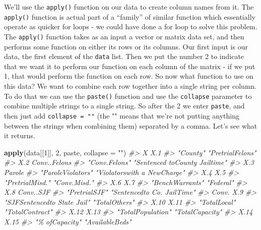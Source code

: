 \documentclass[
  12pt,
]{book}
\newenvironment{Shaded}{\begin{snugshade}}{\end{snugshade}}
\newcommand{\CommentTok}[1]{\textcolor[rgb]{0.37,0.37,0.37}{\textit{#1}}}
\newcommand{\DataTypeTok}[1]{\textcolor[rgb]{0.27,0.27,0.27}{#1}}
\newcommand{\DecValTok}[1]{\textcolor[rgb]{0.06,0.06,0.06}{#1}}
\newcommand{\KeywordTok}[1]{\textcolor[rgb]{0.27,0.27,0.27}{\textbf{#1}}}
\newcommand{\NormalTok}[1]{#1}
\newcommand{\StringTok}[1]{\textcolor[rgb]{0.5,0.5,0.5}{#1}}
\begin{document}
We'll use the \texttt{apply()} function on our data to create column names from it. The \texttt{apply()} function is actual part of a ``family'' of similar function which essentially operate as quicker for loops - we could have done a for loop to solve this problem. The \texttt{apply()} function takes as an input a vector or matrix data set, and then performs some function on either its rows or its columns. Our first input is our data, the first element of the \texttt{data} list. Then we put the number 2 to indicate that we want it to perform our function on each column of the matrix - if we put 1, that would perform the function on each row. So now what function to use on this data? We want to combine each row together into a single string per column. To do that we can use the \texttt{paste()} function and use the \texttt{collapse} parameter to combine multiple strings to a single string. So after the 2 we enter \texttt{paste}, and then just add \texttt{collapse\ =\ ""} (the "" means that we're not putting anything between the strings when combining them) separated by a comma. Let's see what it returns.

\begin{Shaded}
\begin{Highlighting}[]
\KeywordTok{apply}\NormalTok{(data[[}\DecValTok{1}\NormalTok{]], }\DecValTok{2}\NormalTok{, paste, }\DataTypeTok{collapse =} \StringTok{""}\NormalTok{)}
\CommentTok{\#>                             X                           X.1 }
\CommentTok{\#>                      "County"              "PretrialFelons" }
\CommentTok{\#>                           X.2                  Conv..Felons }
\CommentTok{\#>                 "Conv.Felons" "Sentenced toCounty Jailtime" }
\CommentTok{\#>                           X.3                        Parole }
\CommentTok{\#>             "ParoleViolators"   "Violatorswith a NewCharge" }
\CommentTok{\#>                           X.4                           X.5 }
\CommentTok{\#>               "PretrialMisd."                  "Conv.Misd." }
\CommentTok{\#>                           X.6                           X.7 }
\CommentTok{\#>               "BenchWarrants"                     "Federal" }
\CommentTok{\#>                           X.8                     Conv..SJF }
\CommentTok{\#>                 "PretrialSJF"    "Sentencedto Co. JailTime" }
\CommentTok{\#>                         Conv.                           X.9 }
\CommentTok{\#>   "SJFSentencedto State Jail"                 "TotalOthers" }
\CommentTok{\#>                          X.10                          X.11 }
\CommentTok{\#>                  "TotalLocal"               "TotalContract" }
\CommentTok{\#>                          X.12                          X.13 }
\CommentTok{\#>             "TotalPopulation"               "TotalCapacity" }
\CommentTok{\#>                          X.14                          X.15 }
\CommentTok{\#>                "\% ofCapacity"               "AvailableBeds"}
\end{Highlighting}
\end{Shaded}
\end{document}
